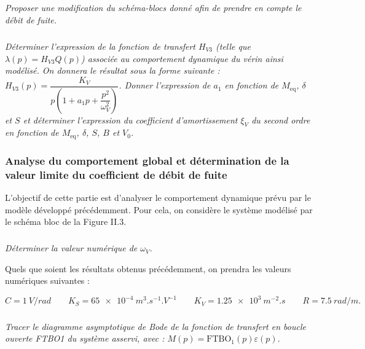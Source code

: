 \documentclass[10pt,fleqn]{article} %
\begin{document}
\begin{multicols}{2}
\subparagraph{}\textit{Proposer une modification du schéma-blocs donné afin de prendre en compte le débit de fuite.}
\ifprof
\begin{corrige}
\begin{center}
\end{center}
\end{corrige}
\else
\fi
\begin{center}
\end{center}


\subparagraph{}\textit{Déterminer l'expression de la fonction de transfert $H_{V3}$ (telle que $\lambda(p) =  H_{V3} Q(p)$) associée au comportement dynamique du vérin ainsi modélisé. On donnera le résultat sous la forme suivante : 
$H_{V3}(p)=\dfrac{K_V}{p\left(1+a_1 p + \dfrac{p^2}{\omega_V^2} \right)}$.  
Donner l'expression de $a_1$ en fonction de $M_{\text{eq}}$, $\delta$ et $S$ et déterminer l'expression du coefficient d'amortissement $\xi_V$ du second ordre en fonction de $M_{\text{eq}}$, $\delta$, $S$, $B$ et $V_0$.}
\ifprof
\begin{corrige}
\begin{center}
\end{center}
\end{corrige}
\else
\fi

\subsubsection*{Analyse du comportement global et détermination de la valeur limite du coefficient de débit de fuite}


L'objectif de cette partie est d'analyser le comportement dynamique prévu par le modèle développé précédemment. Pour cela, on considère le système modélisé par le schéma bloc de la Figure II.3.

\subparagraph{}\textit{Déterminer la valeur numérique de $\omega_V$.}
\ifprof
\begin{corrige}
\end{corrige}
\else
\fi


Quels que soient les résultats obtenus précédemment, on prendra les valeurs numériques suivantes :

$$C = \SI{1}{V/rad} \quad\quad K_S = \SI{65e-4}{m^3.s^{-1}.V^{-1}} \quad\quad  K_V = \SI{1,25e3}{m^{-2}.s}\quad\quad  R = \SI{7,5}{rad/m}.$$


\subparagraph{}\textit{Tracer le diagramme asymptotique de Bode de la fonction de transfert en boucle ouverte FTBO1 du système asservi, avec : $M(p)=\text{FTBO}_1(p) \varepsilon(p)$.}
\ifprof
\begin{corrige}
\end{corrige}
\else
\fi


\end{multicols}
\end{document}
